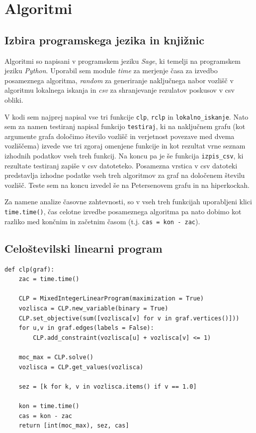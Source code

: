 \documentclass[a4paper, 12 pt]{article}
\theoremstyle{definition}
\theoremstyle{plain}
\theoremstyle{remark}
\begin{document}
\newpage
\section{Algoritmi} %
\subsection{Izbira programskega jezika in knjižnic}
Algoritmi so napisani v programskem jeziku \textit{Sage}, ki temelji na programskem jeziku \textit{Python}. Uporabil sem module \textit{time} za merjenje časa za izvedbo posameznega algoritma, \textit{random} za generiranje naključnega nabor vozlišč v algoritmu lokalnega iskanja in \textit{csv} za shranjevanje rezulatov poskusov v csv obliki.

V kodi sem najprej napisal vse tri funkcije \verb|clp|, \verb|rclp| in \verb|lokalno_iskanje|. Nato sem za namen testiranj napisal funkcijo \verb|testiraj|, ki na naključnem grafu (kot argumente grafa določimo število vozlišč in verjetnost povezave med dvema vozliščema) izvede vse tri zgoraj omenjene funkcije in kot rezultat vrne seznam izhodnih podatkov vseh treh funkcij. Na koncu pa je še funkcija \verb|izpis_csv|, ki rezultate testiranj zapiše v csv datoteteko. Posamezna vrstica v csv datoteki predstavlja izhodne podatke vseh treh algoritmov za graf na določenem številu vozlišč. Teste sem na koncu izvedel še na Petersenovem grafu in na hiperkockah.

Za namene analize časovne zahtevnosti, so v vseh treh funkcijah uporabljeni klici \verb|time.time()|, čas celotne izvedbe posameznega algoritma pa nato dobimo kot razliko med končnim in začetnim časom (t.j. \verb|cas = kon - zac|).

\subsection{Celoštevilski linearni program} \label{CLP}
\begin{verbatim}
def clp(graf):
    zac = time.time()

    CLP = MixedIntegerLinearProgram(maximization = True) 
    vozlisca = CLP.new_variable(binary = True) 
    CLP.set_objective(sum([vozlisca[v] for v in graf.vertices()])) 
    for u,v in graf.edges(labels = False):
        CLP.add_constraint(vozlisca[u] + vozlisca[v] <= 1) 

    moc_max = CLP.solve() 
    vozlisca = CLP.get_values(vozlisca) 

    sez = [k for k, v in vozlisca.items() if v == 1.0]

    kon = time.time() 
    cas = kon - zac
    return [int(moc_max), sez, cas]
\end{verbatim}
\newpage
\end{document}
